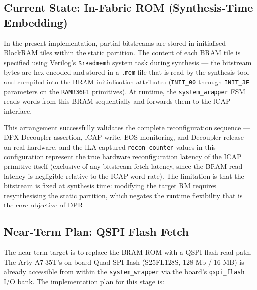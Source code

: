 \subsection{Current State: In-Fabric ROM (Synthesis-Time Embedding)}

In the present implementation, partial bitstreams are stored in initialised BlockRAM tiles within the static partition. The content of each BRAM tile is specified using Verilog's \texttt{\$readmemh} system task during synthesis — the bitstream bytes are hex-encoded and stored in a \texttt{.mem} file that is read by the synthesis tool and compiled into the BRAM initialisation attributes (\texttt{INIT\_00} through \texttt{INIT\_3F} parameters on the \texttt{RAMB36E1} primitives). At runtime, the \texttt{system\_wrapper} FSM reads words from this BRAM sequentially and forwards them to the ICAP interface.

This arrangement successfully validates the complete reconfiguration sequence — DFX Decoupler assertion, ICAP write, EOS monitoring, and Decoupler release — on real hardware, and the ILA-captured \texttt{recon\_counter} values in this configuration represent the true hardware reconfiguration latency of the ICAP primitive itself (exclusive of any bitstream fetch latency, since the BRAM read latency is negligible relative to the ICAP word rate). The limitation is that the bitstream is fixed at synthesis time: modifying the target RM requires resynthesising the static partition, which negates the runtime flexibility that is the core objective of DPR.

\subsection{Near-Term Plan: QSPI Flash Fetch}

The near-term target is to replace the BRAM ROM with a QSPI flash read path. The Arty A7-35T's on-board Quad-SPI flash (S25FL128S, 128 Mb / 16 MB) is already accessible from within the \texttt{system\_wrapper} via the board's \texttt{qspi\_flash} I/O bank. The implementation plan for this stage is:

